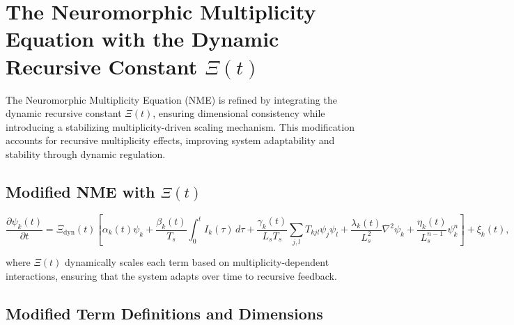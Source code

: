 \documentclass{article}
\theoremstyle{plain}
\begin{document}
\section{The Neuromorphic Multiplicity Equation with the Dynamic Recursive Constant \(\Xi(t) \)}

The Neuromorphic Multiplicity Equation (NME) is refined by integrating the dynamic recursive constant \(\Xi(t) \), ensuring dimensional consistency while introducing a stabilizing multiplicity-driven scaling mechanism. This modification accounts for recursive multiplicity effects, improving system adaptability and stability through dynamic regulation.

\subsection{Modified NME with \(\Xi(t) \)}

\begin{equation}
\frac{\partial \psi_k(t)}{\partial t} = \Xi_{\text{dyn}}(t) \left[ \alpha_k(t) \psi_k + \frac{\beta_k(t)}{T_s} \int_0^t I_k(\tau) \, d\tau + \frac{\gamma_k(t)}{L_s T_s} \sum_{j,l} T_{kjl} \psi_j \psi_l + \frac{\lambda_k(t)}{L_s^2} \nabla^2 \psi_k + \frac{\eta_k(t)}{L_s^{n-1}} \psi_k^n \right] + \xi_k(t),
\end{equation}

where \(\Xi(t) \) dynamically scales each term based on multiplicity-dependent interactions, ensuring that the system adapts over time to recursive feedback.

\subsection{Modified Term Definitions and Dimensions}
\end{document}

